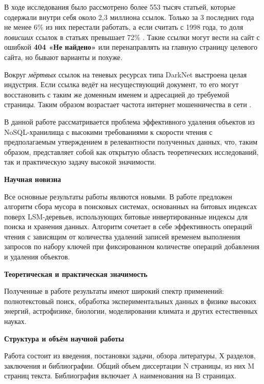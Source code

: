В ходе исследования было рассмотрено более 553 тысяч статьей, которые содержали
внутри себя около 2,3 миллиона ссылок. Только за 3 последних года не менее 6\%
из них перестали работать, а если считать с 1998 года, то доля \textit{повисших}
ссылок в статьях превышает 72\% \cite{NYT}. Такие ссылки могут вести на сайт с
ошибкой \textbf{404 «Не найдено»} или перенаправлять на главную страницу целевого
сайта, но бывают варианты и похуже.

Вокруг \textit{мёртвых} ссылок на теневых ресурсах типа DarkNet выстроена целая
индустрия. Если ссылка ведёт на несуществующий документ, то его могут восстановить
с таким же доменным именем и адресацией до требуемой страницы. Таким образом
возрастает частота интернет мошенничества в сети \cite{Fraud}.

В данной работе рассматривается проблема эффективного удаления объектов из
NoSQL-хранилища с высокими требованиями к скорости чтения с предполагаемым
утверждением в релевантности полученных данных, что, таким образом, представляет
собой как открытую область теоретических исследований, так и практическую задачу
высокой значимости.

\textbf{Научная новизна}

Все основные результаты работы являются новыми. В работе предложен алгоритм
сбора мусора в поисковых системах, основанных на битовых индексах
поверх LSM-деревьев, использующих битовые инвертированные индексы для поиска и
хранения данных. Алгоритм сочетает в себе эффективность операций чтения с
зависящим от количества удалений записей временем выполнения запросов по
набору ключей при фиксированном количестве операций добавления и удаления
объектов.

\textbf{Теоретическая и практическая значимость}

Полученные в работе результаты имеют широкий спектр применений: полнотекстовый поиск,
обработка экспериментальных данных в физике высоких энергий, астрофизике, биологии,
моделировании климата и других естественных науках.

\textbf{Структура и объём научной работы}

Работа состоит из введения, постановки задачи, обзора литературы, Х
разделов, заключения и библиографии. Общий объем диссертации N страницы, из
них M страниц текста. Библиография включает A наименования на B страницах.

